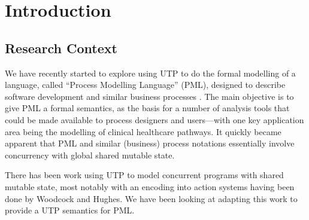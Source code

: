 \section{Introduction}\label{sec:Intro}

\subsection{Research Context}\label{ssec:context}

We have recently started to explore using UTP
to do the  formal modelling of a language,
called ``Process Modelling Language'' (PML),
designed to describe software development and similar business
processes \cite{DBLP:journals/infsof/AtkinsonWN07}.
The main objective is to give PML a formal semantics,
as the basis for a number of analysis tools that could be made available
to process designers and users---with one key application
area being the modelling of clinical healthcare pathways.
It quickly became apparent that PML and similar (business) process
notations essentially involve concurrency with global shared mutable state.

There has been work using UTP
to model concurrent programs with shared mutable state,
most notably
with an encoding into action systems having been done by
Woodcock and Hughes\cite{DBLP:conf/icfem/WoodcockH02}.
We have been looking at adapting this work to provide a UTP semantics
for PML.

